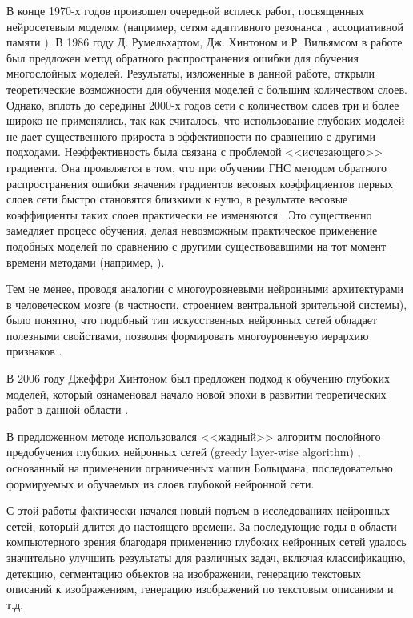 В конце 1970-х годов произошел очередной всплеск работ, посвященных нейросетевым моделям (например, сетям адаптивного резонанса \cite[c.~187]{Grossberg1976}, ассоциативной памяти \cite[c.~69]{Kohonen1977}).
В 1986 году Д. Румельхартом, Дж. Хинтоном и Р. Вильямсом в работе \cite[c.~4-8]{rumelhart1986learning} был предложен метод обратного распространения ошибки для обучения многослойных моделей. Результаты, изложенные в данной работе, открыли теоретические возможности для обучения моделей с большим количеством слоев.  Однако, вплоть до середины 2000-х годов сети с количеством слоев три и более широко не применялись, так как считалось, что использование глубоких моделей не дает существенного прироста в эффективности по сравнению с другими подходами. Неэффективность была связана с проблемой <<исчезающего>> градиента. Она проявляется в том, что при обучении ГНС методом обратного распространения ошибки значения градиентов весовых коэффициентов первых слоев сети быстро становятся близкими к нулю, в результате весовые коэффициенты таких слоев практически не изменяются \cite[c.~38]{n5}. Это существенно замедляет процесс обучения, делая невозможным практическое применение подобных моделей по сравнению с другими существовавшими на тот момент времени методами (например, \cite[c.~274]{Corinna1995}).

Тем не менее, проводя аналогии с многоуровневыми нейронными архитектурами в человеческом мозге (в частности, строением вентральной зрительной системы), было понятно, что подобный тип искусственных нейронных сетей обладает полезными свойствами, позволяя формировать многоуровневую иерархию признаков \cite[c.~66]{Behnke2003}.

В 2006 году Джеффри Хинтоном был предложен подход к обучению глубоких моделей, который ознаменовал начало новой эпохи в развитии теоретических работ в данной области \cite[c.~1533-1538]{n1}.

В предложенном методе использовался <<жадный>> алгоритм послойного предобучения глубоких нейронных сетей (greedy layer-wise algorithm) \cite[c.~3-4]{Hinton2009}, основанный на применении ограниченных машин Больцмана, последовательно формируемых и обучаемых из слоев глубокой нейронной сети. 

С этой работы фактически начался новый подъем в исследованиях нейронных сетей, который длится до настоящего времени. За последующие годы в области компьютерного зрения благодаря применению глубоких нейронных сетей удалось значительно улучшить результаты для различных задач, включая классификацию, детекцию, сегментацию объектов на изображении, генерацию текстовых описаний к изображениям, генерацию изображений по текстовым описаниям и т.д.  %

